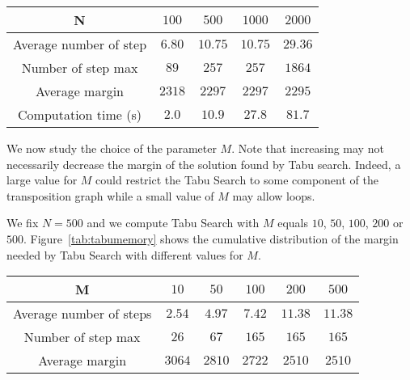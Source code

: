 \begin{center}
\begin{tabular}{ |c|c|c|c|c| }
\hline
    N & $100$&$500$& $1000$& $2000$\\
    \hline
    Average number of step & $6.80$ & $10.75$& $10.75$& $29.36$\\
    \hline
    Number of step max & $89$ & $257$& $257$& $1864$\\

    \hline

     Average margin & $2318$ & $2297$& $2297$& $2295$\\

    \hline
    Computation time (s) & $2.0$ & $10.9$& $27.8$& $81.7$\\

    \hline
 \end{tabular}
\end{center}




We now study the choice of the parameter $M$. Note that increasing may not necessarily decrease the margin
of the solution found by Tabu search. Indeed, a large value for $M$ could restrict the Tabu Search to some component of the transposition graph while a small value of $M$ may allow loops.

We fix $N = 500$ and we compute Tabu Search with $M$ equals $10$, $50$, $100$, $200$ or $500$.
Figure~\ref{tab:tabumemory} shows the cumulative distribution of the margin needed by Tabu Search with different values for $M$. 

\begin{center}
\begin{tabular}{ |c|c|c|c|c|c| }
\hline
    M & $10$&$50$& $100$& $200$& $500$\\
    \hline
    Average number of steps & $2.54$ & $4.97$& $7.42$& $11.38$ & $11.38$\\
    \hline
    Number of step max & $26$ & $67$& $165$& $165$ & $165$\\
    \hline
     Average margin & $3064$ & $2810$& $2722$& $2510$ & $2510$\\
    \hline
 \end{tabular}
\end{center}

